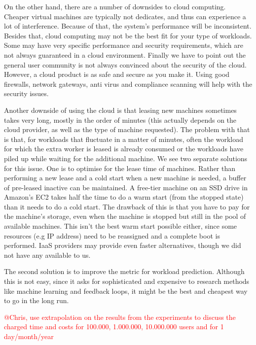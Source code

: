 \documentclass{stylesheet}
\begin{document}
On the other hand, there are a number of downsides to cloud computing. Cheaper virtual machines are typically not dedicates, and thus can experience a lot of interference. Because of that, the system's performance will be inconsistent. Besides that, cloud computing may not be the best fit for your type of workloads. Some may have very specific performance and security requirements, which are not always guaranteed in a cloud environment. Finally we have to point out the general user community is not always convinced about the security of the cloud. However, a cloud product is as safe and secure as you make it. Using good firewalls, network gateways, anti virus and compliance scanning will help with the security issues.

Another downside of using the cloud is that leasing new machines sometimes takes very long, mostly in the order of minutes (this actually depends on the cloud provider, as well as the type of machine requested). The problem with that is that, for workloads that fluctuate in a matter of minutes, often the workload for which the extra worker is leased is already consumed or the workloads have piled up while waiting for the additional machine. We see two separate solutions for this issue. One is to optimise for the lease time of machines. Rather than performing a new lease and a cold start when a new machine is needed, a buffer of pre-leased inactive can be maintained. A free-tier machine on an SSD drive in Amazon's EC2 takes half the time to do a warm start (from the stopped state) than it needs to do a cold start. The drawback of this is that you have to pay for the machine's storage, even when the machine is stopped but still in the pool of available machines. This isn't the best warm start possible either, since some resources (e.g IP address) need to be reassigned and a complete boot is performed. IaaS providers may provide even faster alternatives, though we did not have any available to us.

The second solution is to improve the metric for workload prediction. Although this is not easy, since it asks for sophisticated and expensive to research methods like machine learning and feedback loops, it might be the best and cheapest way to go in the long run.

\textcolor{red}{@Chris, use extrapolation on the results from the experiments to discuss the charged time and costs for 100.000, 1.000.000, 10.000.000 users and for 1 day/month/year}
\end{document}
